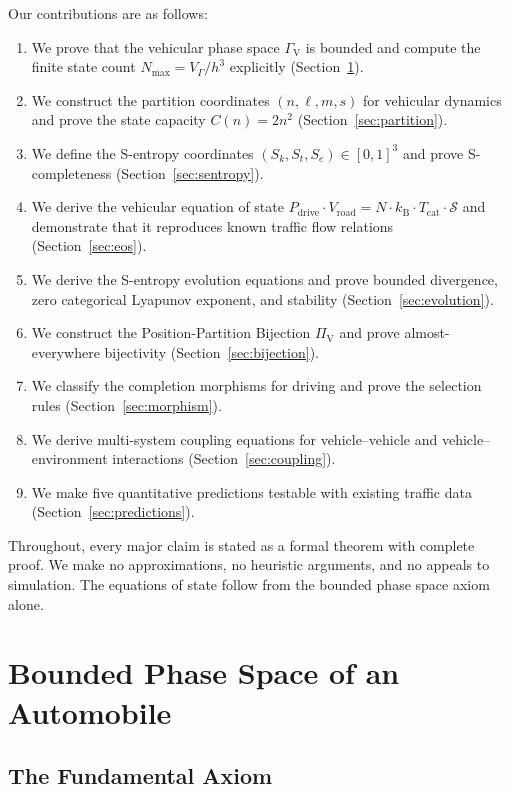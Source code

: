 \documentclass[twocolumn,10pt]{article}
\newcommand{\kB}{k_{\mathrm{B}}}
\newcommand{\Tcat}{T_{\mathrm{cat}}}
\newcommand{\Pdrive}{P_{\mathrm{drive}}}
\newcommand{\Vroad}{V_{\mathrm{road}}}
\newcommand{\GammaV}{\Gamma_{\mathrm{V}}}
\newcommand{\VGamma}{V_{\Gamma}}
\newcommand{\Nmax}{N_{\mathrm{max}}}
\newcommand{\PiV}{\Pi_{\mathrm{V}}}
\newcommand{\Sk}{S_k}
\newcommand{\St}{S_t}
\newcommand{\Se}{S_e}
\begin{document}
Our contributions are as follows:
\begin{enumerate}
    \item We prove that the vehicular phase space $\GammaV$ is bounded and compute the finite state count $\Nmax = \VGamma / h^3$ explicitly (Section~\ref{sec:bounded}).
    \item We construct the partition coordinates $(n, \ell, m, s)$ for vehicular dynamics and prove the state capacity $C(n) = 2n^2$ (Section~\ref{sec:partition}).
    \item We define the S-entropy coordinates $(\Sk, \St, \Se) \in [0,1]^3$ and prove S-completeness (Section~\ref{sec:sentropy}).
    \item We derive the vehicular equation of state $\Pdrive \cdot \Vroad = N \cdot \kB \cdot \Tcat \cdot \mathcal{S}$ and demonstrate that it reproduces known traffic flow relations (Section~\ref{sec:eos}).
    \item We derive the S-entropy evolution equations and prove bounded divergence, zero categorical Lyapunov exponent, and stability (Section~\ref{sec:evolution}).
    \item We construct the Position-Partition Bijection $\PiV$ and prove almost-everywhere bijectivity (Section~\ref{sec:bijection}).
    \item We classify the completion morphisms for driving and prove the selection rules (Section~\ref{sec:morphism}).
    \item We derive multi-system coupling equations for vehicle--vehicle and vehicle--environment interactions (Section~\ref{sec:coupling}).
    \item We make five quantitative predictions testable with existing traffic data (Section~\ref{sec:predictions}).
\end{enumerate}

Throughout, every major claim is stated as a formal theorem with complete proof. We make no approximations, no heuristic arguments, and no appeals to simulation. The equations of state follow from the bounded phase space axiom alone.


\section{Bounded Phase Space of an Automobile}\label{sec:bounded}

\subsection{The Fundamental Axiom}
\end{document}
